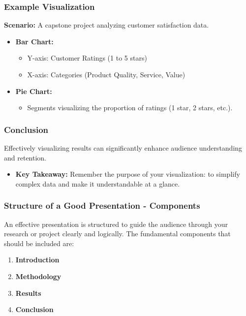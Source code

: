 \documentclass[aspectratio=169]{beamer}
\begin{document}
\begin{frame}[fragile]
  \frametitle{Example Visualization}
  \textbf{Scenario:} A capstone project analyzing customer satisfaction data.
  \begin{itemize}
    \item \textbf{Bar Chart:}
      \begin{itemize}
        \item Y-axis: Customer Ratings (1 to 5 stars)
        \item X-axis: Categories (Product Quality, Service, Value)
      \end{itemize}
  
    \item \textbf{Pie Chart:}
      \begin{itemize}
        \item Segments visualizing the proportion of ratings (1 star, 2 stars, etc.).
      \end{itemize}
  \end{itemize}
\end{frame}

\begin{frame}[fragile]
  \frametitle{Conclusion}
  Effectively visualizing results can significantly enhance audience understanding and retention.
  \begin{itemize}
    \item \textbf{Key Takeaway:} Remember the purpose of your visualization: to simplify complex data and make it understandable at a glance.
  \end{itemize}
\end{frame}

\begin{frame}[fragile]
    \frametitle{Structure of a Good Presentation - Components}
    An effective presentation is structured to guide the audience through your research or project clearly and logically. The fundamental components that should be included are:
    
    \begin{enumerate}
        \item \textbf{Introduction}
        \item \textbf{Methodology}
        \item \textbf{Results}
        \item \textbf{Conclusion}
    \end{enumerate}
\end{frame}
\end{document}
